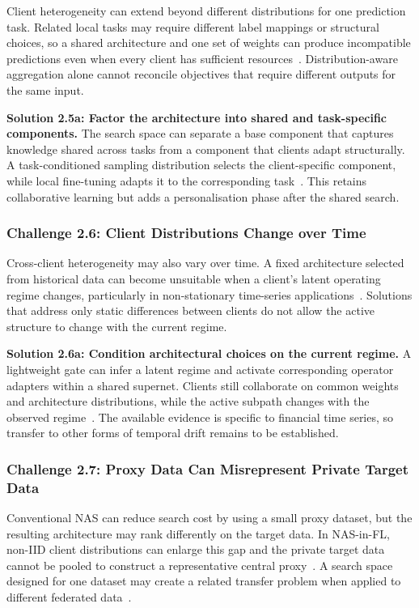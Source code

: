Client heterogeneity can extend beyond different distributions for one prediction task. Related local tasks may require different label mappings or structural choices, so a shared architecture and one set of weights can produce incompatible predictions even when every client has sufficient resources~\cite{fedpnas_2021}. Distribution-aware aggregation alone cannot reconcile objectives that require different outputs for the same input.

\noindent\textbf{Solution 2.5a: Factor the architecture into shared and task-specific components.} The search space can separate a base component that captures knowledge shared across tasks from a component that clients adapt structurally. A task-conditioned sampling distribution selects the client-specific component, while local fine-tuning adapts it to the corresponding task~\cite{fedpnas_2021}. This retains collaborative learning but adds a personalisation phase after the shared search.

\subsubsection{Challenge 2.6: Client Distributions Change over Time}

Cross-client heterogeneity may also vary over time. A fixed architecture selected from historical data can become unsuitable when a client's latent operating regime changes, particularly in non-stationary time-series applications~\cite{fedregnas_2025}. Solutions that address only static differences between clients do not allow the active structure to change with the current regime.

\noindent\textbf{Solution 2.6a: Condition architectural choices on the current regime.} A lightweight gate can infer a latent regime and activate corresponding operator adapters within a shared supernet. Clients still collaborate on common weights and architecture distributions, while the active subpath changes with the observed regime~\cite{fedregnas_2025}. The available evidence is specific to financial time series, so transfer to other forms of temporal drift remains to be established.

\subsubsection{Challenge 2.7: Proxy Data Can Misrepresent Private Target Data}

Conventional NAS can reduce search cost by using a small proxy dataset, but the resulting architecture may rank differently on the target data. In NAS-in-FL, non-IID client distributions can enlarge this gap and the private target data cannot be pooled to construct a representative central proxy~\cite{privacy-preserving_nas_across_fl_iot_2021}. A search space designed for one dataset may create a related transfer problem when applied to different federated data~\cite{privacy_preserving_fednas_for_edge_2025}.

